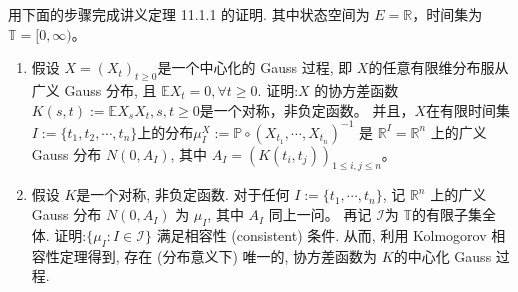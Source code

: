 \documentclass{ctexart}
\begin{document}
\begin{problem}\label{pro:2}
  用下面的步骤完成讲义定理 11.1.1 的证明.
  其中状态空间为 \(E = \mathbb{R}\)，时间集为\( \mathbb{T} = [0, \infty)\)。
  \begin{enumerate}
    \item 假设 \(X = (X_t)_{t \geq 0} \)是一个中心化的 Gauss 过程, 即 \(X \)的任意有限维分布服从广义 Gauss 分布,
      且 \(\mathbb{E}X_t = 0, \forall t \geq 0\). 证明:\( X\) 的协方差函数\( K(s, t) := \mathbb{E}X_sX_t, s, t \geq 0 \)是一个对称，非负定函数。
      并且，\(X \)在有限时间集 \(I := \{t_1, t_2,\cdots, t_n\} \)上的分布\( \mu^X_I := \mathbb{P} \circ (X_{t_1}, \cdots , X_{t_n})^{-1}\)
      是 \(\mathbb{R}^I = \mathbb{R}^n\) 上的广义 Gauss 分布 \(N(0, A_I)\),
      其中 \(A_I = (K(t_i, t_j))_{1 \leq i,j \leq n}\)。
    \item
      假设 \(K \)是一个对称, 非负定函数. 对于任何 \(I := \{t_1,\cdots, t_n\}\),
      记 \(\mathbb{R}^n\) 上的广义 Gauss 分布 \(N(0, A_I)\) 为 \(\mu_I\), 其中 \(A_I\) 同上一问。
      再记 \(\mathcal{I} \)为 \(\mathbb{T} \)的有限子集全体. 证明:\( \{\mu_I : I \in \mathcal{I} \}\) 满足相容性 (consistent) 条件. 从而,
      利用 Kolmogorov 相容性定理得到, 存在 (分布意义下) 唯一的, 协方差函数为 \(K \)的中心化 Gauss 过程.
  \end{enumerate}
\end{problem}
\end{document}
